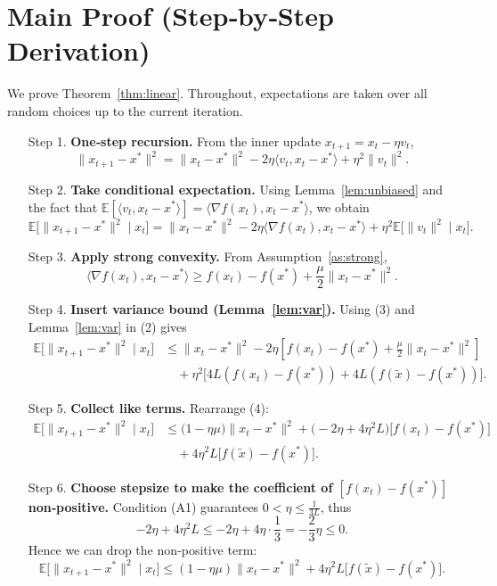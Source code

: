 \documentclass{article}
\newcommand{\E}{\mathbb{E}}
\begin{document}
\section*{Main Proof (Step‑by‑Step Derivation)}
We prove Theorem~\ref{thm:linear}.  Throughout, expectations are taken over all random choices up to the current iteration.

\begin{enumerate}
\item[Step 1.] \textbf{One‑step recursion.}  
From the inner update $x_{t+1}=x_{t}-\eta v_{t}$,
\[
\|x_{t+1}-x^{*}\|^{2}
= \|x_{t}-x^{*}\|^{2}
-2\eta\langle v_{t},x_{t}-x^{*}\rangle
+\eta^{2}\|v_{t}\|^{2}. \tag{1}
\]

\item[Step 2.] \textbf{Take conditional expectation.}  
Using Lemma~\ref{lem:unbiased} and the fact that $\E[\langle v_{t},x_{t}-x^{*}\rangle]=\langle\nabla f(x_{t}),x_{t}-x^{*}\rangle$, we obtain
\[
\E\!\bigl[\|x_{t+1}-x^{*}\|^{2}\mid x_{t}\bigr]
= \|x_{t}-x^{*}\|^{2}
-2\eta\langle\nabla f(x_{t}),x_{t}-x^{*}\rangle
+\eta^{2}\E\!\bigl[\|v_{t}\|^{2}\mid x_{t}\bigr]. \tag{2}
\]

\item[Step 3.] \textbf{Apply strong convexity.}  
From Assumption~\ref{as:strong},
\[
\langle\nabla f(x_{t}),x_{t}-x^{*}\rangle\ge f(x_{t})-f(x^{*})+\frac{\mu}{2}\|x_{t}-x^{*}\|^{2}. \tag{3}
\]

\item[Step 4.] \textbf{Insert variance bound (Lemma~\ref{lem:var}).}  
Using (3) and Lemma~\ref{lem:var} in (2) gives
\[
\begin{aligned}
\E\!\bigl[\|x_{t+1}-x^{*}\|^{2}\mid x_{t}\bigr]
&\le \|x_{t}-x^{*}\|^{2}
-2\eta\!\left[f(x_{t})-f(x^{*})+\frac{\mu}{2}\|x_{t}-x^{*}\|^{2}\right] \\
&\quad +\eta^{2}\!\bigl[4L(f(x_{t})-f(x^{*})) +4L(f(\tilde{x})-f(x^{*}))\bigr].
\end{aligned} \tag{4}
\]

\item[Step 5.] \textbf{Collect like terms.}  
Rearrange (4):
\[
\begin{aligned}
\E\!\bigl[\|x_{t+1}-x^{*}\|^{2}\mid x_{t}\bigr]
&\le \bigl(1-\eta\mu\bigr)\|x_{t}-x^{*}\|^{2}
+\bigl(-2\eta+4\eta^{2}L\bigr)\bigl[f(x_{t})-f(x^{*})\bigr] \\
&\quad +4\eta^{2}L\bigl[f(\tilde{x})-f(x^{*})\bigr].
\end{aligned} \tag{5}
\]

\item[Step 6.] \textbf{Choose stepsize to make the coefficient of $[f(x_{t})-f(x^{*})]$ non‑positive.}  
Condition (A1) guarantees $0<\eta\le\frac{1}{3L}$, thus
\[
-2\eta+4\eta^{2}L\le -2\eta+4\eta\cdot\frac{1}{3}= -\frac{2}{3}\eta\le0.
\]
Hence we can drop the non‑positive term:
\[
\E\!\bigl[\|x_{t+1}-x^{*}\|^{2}\mid x_{t}\bigr]
\le (1-\eta\mu)\|x_{t}-x^{*}\|^{2}
+4\eta^{2}L\bigl[f(\tilde{x})-f(x^{*})\bigr]. \tag{6}
\]


\end{enumerate}
\end{document}
